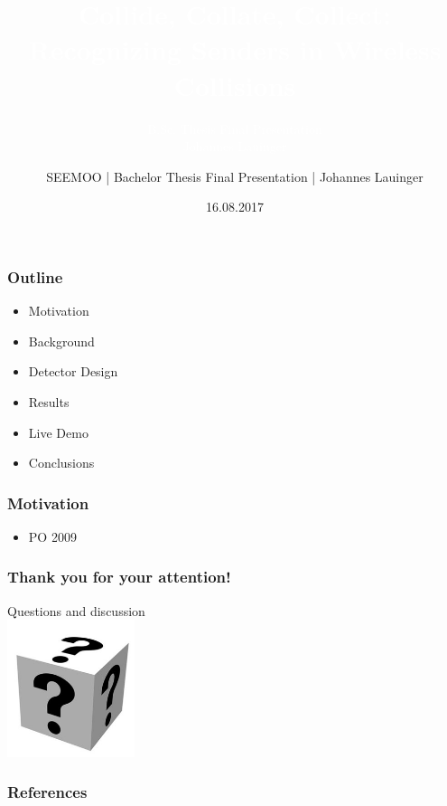 \documentclass[accentcolor=tud8b,colorbacktitle]{tudbeamer}
\title{\textcolor{white}{Collide, Collate, Collect: Recognizing Senders in Wireless Collisions\\}}
\subtitle{\textcolor{white}{B.Sc. Thesis Final Presentation\\Johannes Lauinger}}
\author{SEEMOO | Bachelor Thesis Final Presentation | Johannes Lauinger}
\date{16.08.2017}
\begin{document}
\begin{titleframe}
\end{titleframe}


\begin{frame}
\frametitle{Outline}
\begin{itemize}
	\setlength\itemsep{1em}
	\item Motivation
	\item Background
	\item Detector Design
	\item Results
	\item Live Demo
	\item Conclusions
\end{itemize}
\end{frame}


\begin{frame}
\frametitle{Motivation}
\begin{itemize}
	\setlength\itemsep{1em}
	\item PO 2009 \cite{ieee2012}
\end{itemize}
\end{frame}


\begin{frame}
\frametitle{Thank you for your attention!}
\begin{center}
	\huge Questions and discussion\\
	\vspace{0,6cm}
	\includegraphics[height=4cm]{assets/faq}
\end{center}
\end{frame}


\begin{frame}[allowframebreaks]
\frametitle{References}


\end{frame}
\end{document}
